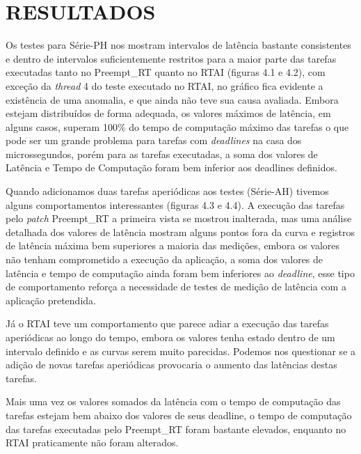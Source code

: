 \chapter{RESULTADOS}
\label{cap:resultados}
Os testes para Série-PH nos mostram intervalos de latência bastante consistentes e dentro de intervalos suficientemente restritos para a maior parte das tarefas executadas tanto no Preempt\_RT quanto no RTAI (figuras 4.1 e 4.2), com exceção da \textit{thread} 4 do teste executado no RTAI, no gráfico fica evidente a existência de uma anomalia, e que ainda não teve sua causa avaliada. Embora estejam distribuídos de forma  adequada, os valores máximos de latência, em alguns casos, superam 100\% do tempo de computação máximo das tarefas o que pode ser um grande problema para tarefas com \textit{deadlines} na casa dos microssegundos, porém para as tarefas executadas, a soma dos valores de Latência e Tempo de Computação foram bem inferior aos deadlines definidos.

Quando adicionamos duas tarefas aperiódicas aos testes (Série-AH) tivemos alguns comportamentos interessantes (figuras 4.3 e 4.4). A execução das tarefas pelo \textit{patch} Preempt\_RT a primeira vista se mostrou inalterada, mas uma análise detalhada dos valores de latência mostram alguns pontos fora da curva e registros de latência máxima bem superiores a maioria das medições, embora os valores não tenham comprometido a execução da aplicação, a soma dos valores de latência e tempo de computação ainda foram bem inferiores ao \textit{deadline}, esse tipo de comportamento reforça a necessidade de testes de medição de latência com a aplicação pretendida.

Já o RTAI teve um comportamento que parece adiar a execução das tarefas aperiódicas ao longo do tempo,  embora os valores tenha estado dentro de um intervalo definido e as curvas serem muito parecidas. Podemos nos questionar se a adição de novas tarefas aperiódicas provocaria o aumento das latências destas tarefas.

Mais uma vez os valores somados da latência com o tempo de computação das tarefas estejam bem abaixo dos valores de seus deadline, o tempo de computação das tarefas executadas pelo Preempt\_RT foram bastante elevados, enquanto no RTAI praticamente não foram alterados.

